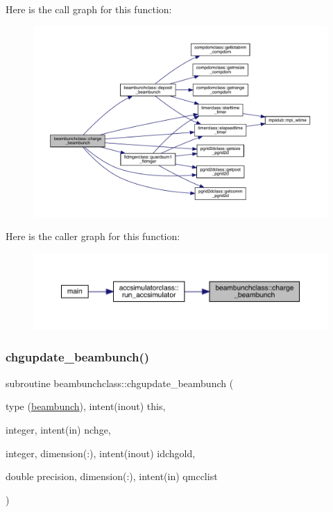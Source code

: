 Here is the call graph for this function\+:\nopagebreak
\begin{figure}[H]
\begin{center}
\leavevmode
\includegraphics[width=350pt]{namespacebeambunchclass_a91563d467d36ccca8231ee2c62483246_cgraph}
\end{center}
\end{figure}
Here is the caller graph for this function\+:\nopagebreak
\begin{figure}[H]
\begin{center}
\leavevmode
\includegraphics[width=350pt]{namespacebeambunchclass_a91563d467d36ccca8231ee2c62483246_icgraph}
\end{center}
\end{figure}
\mbox{\label{namespacebeambunchclass_ac5b1c15c02703f7339b67283bc9816bd}} 
\subsubsection{\texorpdfstring{chgupdate\_beambunch()}{chgupdate\_beambunch()}}
{\footnotesize\ttfamily subroutine beambunchclass\+::chgupdate\+\_\+beambunch (\begin{DoxyParamCaption}\item[{type (\mbox{\hyperlink{namespacebeambunchclass_structbeambunchclass_1_1beambunch}{beambunch}}), intent(inout)}]{this,  }\item[{integer, intent(in)}]{nchge,  }\item[{integer, dimension(\+:), intent(inout)}]{idchgold,  }\item[{double precision, dimension(\+:), intent(in)}]{qmcclist }\end{DoxyParamCaption})}



